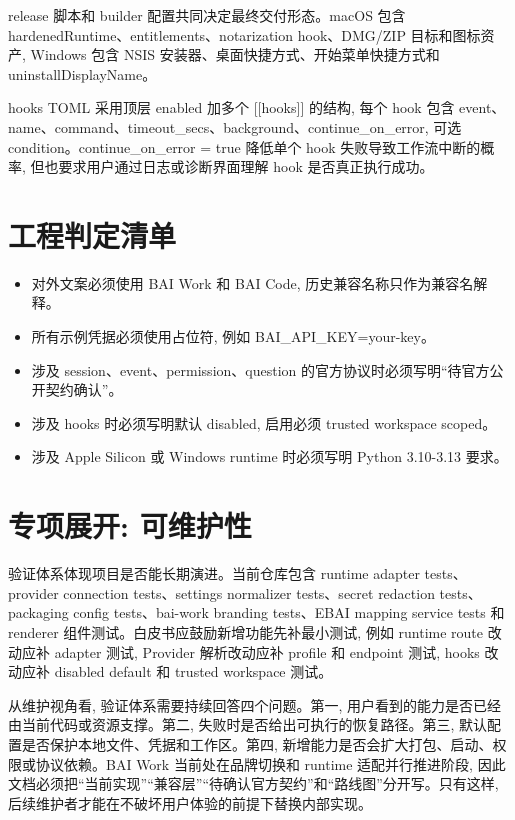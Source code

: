release 脚本和 builder 配置共同决定最终交付形态。macOS 包含 hardenedRuntime、entitlements、notarization hook、DMG/ZIP 目标和图标资产, Windows 包含 NSIS 安装器、桌面快捷方式、开始菜单快捷方式和 uninstallDisplayName。

hooks TOML 采用顶层 enabled 加多个 [[hooks]] 的结构, 每个 hook 包含 event、name、command、timeout\_secs、background、continue\_on\_error, 可选 condition。continue\_on\_error = true 降低单个 hook 失败导致工作流中断的概率, 但也要求用户通过日志或诊断界面理解 hook 是否真正执行成功。

\section{工程判定清单}
\begin{itemize}
  \item 对外文案必须使用 BAI Work 和 BAI Code, 历史兼容名称只作为兼容名解释。
  \item 所有示例凭据必须使用占位符, 例如 BAI\_API\_KEY=your-key。
  \item 涉及 session、event、permission、question 的官方协议时必须写明“待官方公开契约确认”。
  \item 涉及 hooks 时必须写明默认 disabled, 启用必须 trusted workspace scoped。
  \item 涉及 Apple Silicon 或 Windows runtime 时必须写明 Python 3.10-3.13 要求。
\end{itemize}

\section{专项展开: 可维护性}
验证体系体现项目是否能长期演进。当前仓库包含 runtime adapter tests、provider connection tests、settings normalizer tests、secret redaction tests、packaging config tests、bai-work branding tests、EBAI mapping service tests 和 renderer 组件测试。白皮书应鼓励新增功能先补最小测试, 例如 runtime route 改动应补 adapter 测试, Provider 解析改动应补 profile 和 endpoint 测试, hooks 改动应补 disabled default 和 trusted workspace 测试。

从维护视角看, 验证体系需要持续回答四个问题。第一, 用户看到的能力是否已经由当前代码或资源支撑。第二, 失败时是否给出可执行的恢复路径。第三, 默认配置是否保护本地文件、凭据和工作区。第四, 新增能力是否会扩大打包、启动、权限或协议依赖。BAI Work 当前处在品牌切换和 runtime 适配并行推进阶段, 因此文档必须把“当前实现”“兼容层”“待确认官方契约”和“路线图”分开写。只有这样, 后续维护者才能在不破坏用户体验的前提下替换内部实现。

